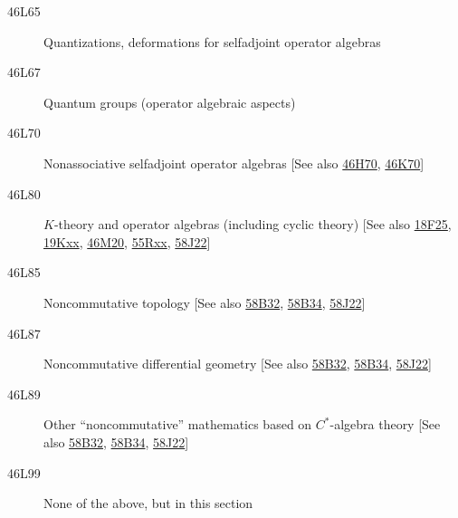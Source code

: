 \documentclass[letterpaper]{article}
\begin{document}
\begin{description}
\item [46L65]\label{46L65} Quantizations, deformations for selfadjoint operator algebras
\item [46L67]\label{46L67} Quantum groups (operator algebraic aspects)
\item [46L70]\label{46L70} Nonassociative selfadjoint operator algebras [See also \hyperref[46H70]{46H70}, \hyperref[46K70]{46K70}]
\item [46L80]\label{46L80} $K$-theory and operator algebras (including cyclic theory) [See also \hyperref[18F25]{18F25}, \hyperref[19Kxx]{19Kxx}, \hyperref[46M20]{46M20}, \hyperref[55Rxx]{55Rxx}, \hyperref[58J22]{58J22}]
\item [46L85]\label{46L85} Noncommutative topology [See also \hyperref[58B32]{58B32}, \hyperref[58B34]{58B34}, \hyperref[58J22]{58J22}]
\item [46L87]\label{46L87} Noncommutative differential geometry [See also \hyperref[58B32]{58B32}, \hyperref[58B34]{58B34}, \hyperref[58J22]{58J22}]
\item [46L89]\label{46L89} Other ``noncommutative'' mathematics based on $C^*$-algebra theory [See also \hyperref[58B32]{58B32}, \hyperref[58B34]{58B34}, \hyperref[58J22]{58J22}]
\item [46L99]\label{46L99} None of the above, but in this section
\end{description}
\end{document}
